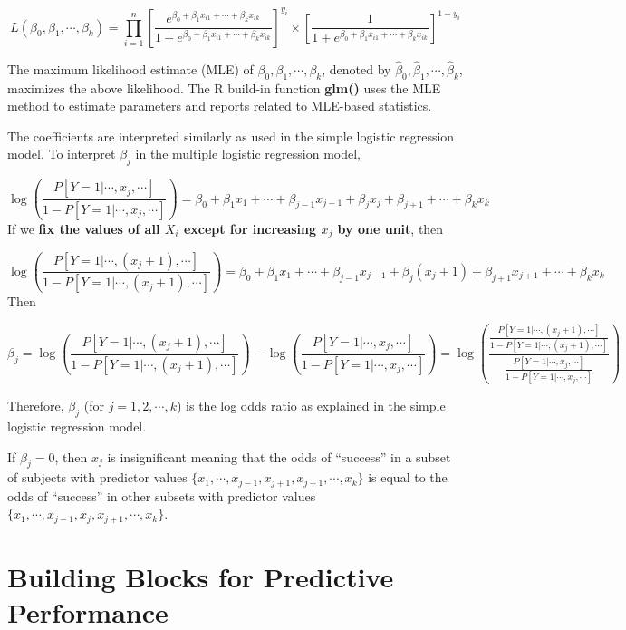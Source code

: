 \documentclass[
]{book}
\begin{document}
\[
L(\beta_0, \beta_1,\cdots, \beta_k)
= \prod_{i=1}^n \left[\frac{e^{\beta_0 + \beta_1 x_{i1}+\cdots+\beta_kx_{ik}}}{1 + e^{\beta_0 + \beta_1 x_{i1}+\cdots+\beta_kx_{ik}}}\right]^{y_i}\times \left[\frac{1}{1 + e^{\beta_0 + \beta_1 x_{i1}+\cdots+\beta_kx_{ik}}} \right]^{1-y_i}
\]

The maximum likelihood estimate (MLE) of \(\beta_0, \beta_1, \cdots, \beta_k\), denoted by \(\hat{\beta}_0,\hat{\beta}_1, \cdots, \hat{\beta}_k\), maximizes the above likelihood. The R build-in function \textbf{glm()} uses the MLE method to estimate parameters and reports related to MLE-based statistics.

The coefficients are interpreted similarly as used in the simple logistic regression model. To interpret \(\beta_j\) in the multiple logistic regression model,

\[
\log\left(\frac{P[Y=1|\cdots,x_j,\cdots]}{1-P[Y=1|\cdots,x_j,\cdots]}\right) = \beta_0 + \beta_1x_1 + \cdots + \beta_{j-1}x_{j-1}+ \beta_jx_j + \beta_{j+1} + \cdots+\beta_kx_k
\]
If we \textbf{fix the values of all \(X_i\) except for increasing \(x_j\) by one unit}, then

\[
\log\left(\frac{P[Y=1|\cdots,(x_j+1),\cdots]}{1-P[Y=1|\cdots,(x_j+1),\cdots]}\right) = \beta_0 + \beta_1x_1 + \cdots + \beta_{j-1}x_{j-1}+ \beta_j(x_j+1) + \beta_{j+1}x_{j+1} + \cdots+\beta_kx_k
\]
Then

\[
\beta_j = \log\left(\frac{P[Y=1|\cdots,(x_j+1),\cdots]}{1-P[Y=1|\cdots,(x_j+1),\cdots]}\right) - \log\left(\frac{P[Y=1|\cdots,x_j,\cdots]}{1-P[Y=1|\cdots,x_j,\cdots]}\right)
=\log \left(\frac{\frac{P[Y=1|\cdots,(x_j+1),\cdots]}{1-P[Y=1|\cdots,(x_j+1),\cdots]}}{\frac{P[Y=1|\cdots,x_j,\cdots]}{1-P[Y=1|\cdots,x_j,\cdots]}}\right)
\]

Therefore, \(\beta_j\) (for \(j=1, 2, \cdots, k\)) is the log odds ratio as explained in the simple logistic regression model.

If \(\beta_j = 0\), then \(x_j\) is insignificant meaning that the odds of ``success'' in a subset of subjects with predictor values \(\{x_1, \cdots, x_{j-1}, x_{j+1}, x_{j+1}, \cdots, x_k \}\) is equal to the odds of ``success'' in other subsets with predictor values \(\{x_1, \cdots, x_{j-1}, x_{j}, x_{j+1}, \cdots, x_k \}\).

\hypertarget{building-blocks-for-predictive-performance}{%
\section{Building Blocks for Predictive Performance}\label{building-blocks-for-predictive-performance}}
\end{document}
